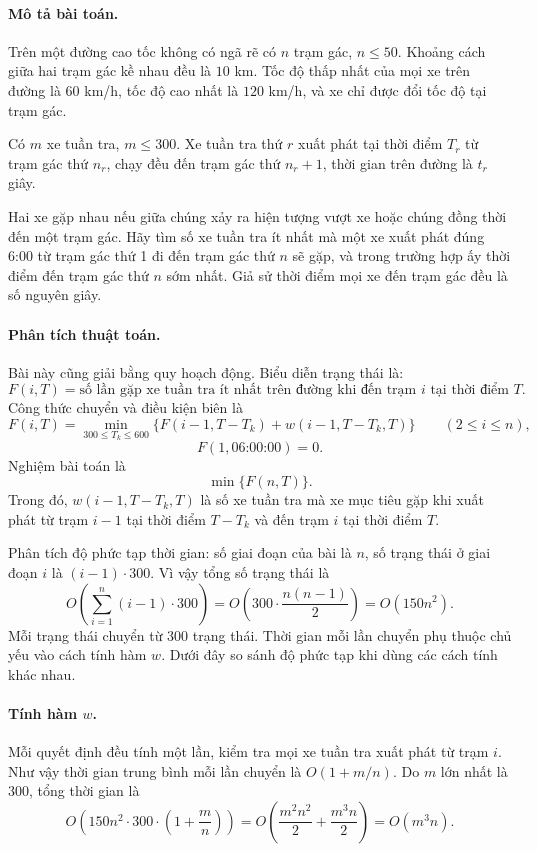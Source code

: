 \documentclass[11pt]{article}
\begin{document}
\paragraph{Mô tả bài toán.}
Trên một đường cao tốc không có ngã rẽ có \(n\) trạm gác, \(n\le50\). Khoảng
cách giữa hai trạm gác kề nhau đều là \(10\) km. Tốc độ thấp nhất của mọi xe
trên đường là \(60\) km/h, tốc độ cao nhất là \(120\) km/h, và xe chỉ được đổi
tốc độ tại trạm gác.

Có \(m\) xe tuần tra, \(m\le300\). Xe tuần tra thứ \(r\) xuất phát tại thời
điểm \(T_r\) từ trạm gác thứ \(n_r\), chạy đều đến trạm gác thứ \(n_r+1\),
thời gian trên đường là \(t_r\) giây.

Hai xe gặp nhau nếu giữa chúng xảy ra hiện tượng vượt xe hoặc chúng đồng thời
đến một trạm gác. Hãy tìm số xe tuần tra ít nhất mà một xe xuất phát đúng
6:00 từ trạm gác thứ 1 đi đến trạm gác thứ \(n\) sẽ gặp, và trong trường hợp
ấy thời điểm đến trạm gác thứ \(n\) sớm nhất. Giả sử thời điểm mọi xe đến
trạm gác đều là số nguyên giây.

\paragraph{Phân tích thuật toán.}
Bài này cũng giải bằng quy hoạch động. Biểu diễn trạng thái là:
\[
  F(i,T)=\text{số lần gặp xe tuần tra ít nhất trên đường khi đến trạm } i
  \text{ tại thời điểm } T.
\]
Công thức chuyển và điều kiện biên là
\[
  F(i,T)=\min_{300\le T_k\le600}
  \{F(i-1,T-T_k)+w(i-1,T-T_k,T)\}\qquad (2\le i\le n),
\]
\[
  F(1,\text{06:00:00})=0.
\]
Nghiệm bài toán là
\[
  \min\{F(n,T)\}.
\]
Trong đó, \(w(i-1,T-T_k,T)\) là số xe tuần tra mà xe mục tiêu gặp khi xuất
phát từ trạm \(i-1\) tại thời điểm \(T-T_k\) và đến trạm \(i\) tại thời điểm
\(T\).

Phân tích độ phức tạp thời gian: số giai đoạn của bài là \(n\), số trạng thái
ở giai đoạn \(i\) là \((i-1)\cdot300\). Vì vậy tổng số trạng thái là
\[
  O\left(\sum_{i=1}^{n}(i-1)\cdot300\right)
  =O\left(300\cdot\frac{n(n-1)}{2}\right)
  =O(150n^2).
\]
Mỗi trạng thái chuyển từ 300 trạng thái. Thời gian mỗi lần chuyển phụ thuộc
chủ yếu vào cách tính hàm \(w\). Dưới đây so sánh độ phức tạp khi dùng các
cách tính khác nhau.

\paragraph{Tính hàm \(w\).}
 Mỗi quyết định đều tính một lần, kiểm tra mọi xe tuần
tra xuất phát từ trạm \(i\). Như vậy thời gian trung bình mỗi lần chuyển là
\(O(1+m/n)\). Do \(m\) lớn nhất là 300, tổng thời gian là
\[
  O\left(150n^2\cdot300\cdot\left(1+\frac{m}{n}\right)\right)
  =O\left(\frac{m^2n^2}{2}+\frac{m^3n}{2}\right)
  =O(m^3n).
\]
\end{document}
